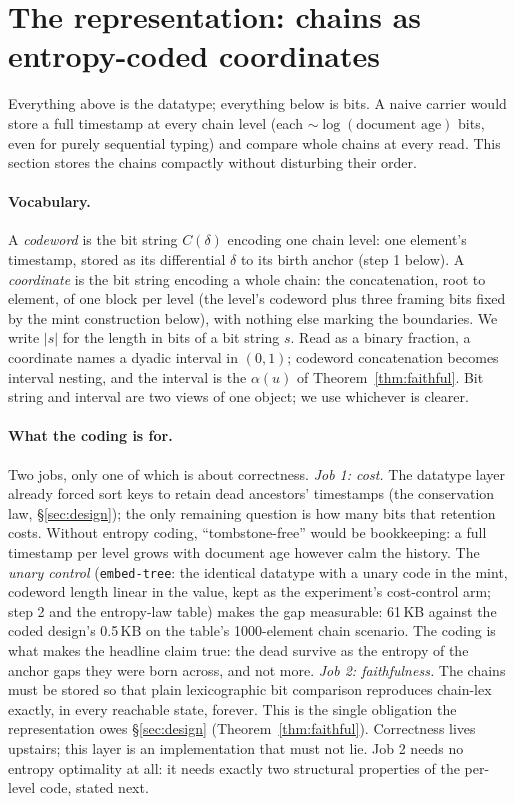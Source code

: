 \documentclass[11pt]{article}
\newcommand{\code}[1]{\texttt{#1}}
\begin{document}
\section{The representation: chains as entropy-coded coordinates}
\label{sec:encoding}

Everything above is the datatype; everything below is bits. A naive
carrier would store a full timestamp at every chain level (each
$\sim\!\log(\text{document age})$ bits, even for purely sequential
typing) and compare whole chains at every read. This section stores
the chains compactly without disturbing their order.

\paragraph{Vocabulary.} A \emph{codeword} is the bit string
$C(\delta)$ encoding one chain level: one element's timestamp,
stored as its differential $\delta$ to its birth anchor (step 1
below). A \emph{coordinate} is the bit string encoding a whole
chain: the concatenation, root to element, of one block per level
(the level's codeword plus three framing bits fixed by the mint
construction below), with nothing else marking the boundaries. We
write $|s|$ for the length in bits of a bit string $s$. Read as a
binary fraction, a coordinate names a dyadic interval in $(0,1)$;
codeword concatenation becomes interval nesting, and the interval is
the $\alpha(u)$ of Theorem~\ref{thm:faithful}. Bit string and
interval are two views of one object; we use whichever is clearer.

\paragraph{What the coding is for.} Two jobs, only one of which is
about correctness.
\emph{Job 1: cost.} The datatype layer already forced sort keys to
retain dead ancestors' timestamps (the conservation law,
\S\ref{sec:design}); the only remaining question is how many bits
that retention costs. Without entropy coding, ``tombstone-free''
would be bookkeeping: a full timestamp per level grows with document
age however calm the history. The \emph{unary control}
(\code{embed-tree}: the identical datatype with a unary code in the
mint, codeword length linear in the value, kept as the experiment's
cost-control arm; step 2 and the entropy-law table) makes the gap
measurable: 61\,KB against the coded design's 0.5\,KB on the table's
1000-element chain scenario. The coding is what makes
the headline claim true: the dead survive as the entropy of the
anchor gaps they were born across, and not more.
\emph{Job 2: faithfulness.} The chains must be stored so that plain
lexicographic bit comparison reproduces chain-lex exactly, in every
reachable state, forever. This is the single obligation the
representation owes \S\ref{sec:design}
(Theorem~\ref{thm:faithful}). Correctness lives upstairs; this layer
is an implementation that must not lie. Job 2 needs no entropy
optimality at all: it needs exactly two structural properties of the
per-level code, stated next.
\end{document}
